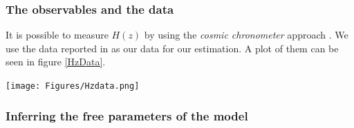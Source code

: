 \documentclass[onecolumn,           %
               showpacs,            %
               preprintnumbers,     %
               aps,                 %
               letterpaper,             %
               superscriptaddress,      %
               nofootinbib,         %
               tightenlines,        %
               floats,floatfix      %
               ,usenatbib,
               ]{revtex4-1}
\begin{document}
%

\subsubsection{The observables and the data}

It is possible to measure $H(z)$ by using the \textit{cosmic chronometer} approach \cite{Hz}. We use the data reported in \cite{Hzdata} as our data for our estimation. A plot of them can be seen in figure \ref{HzData}.

\begin{minipage}{\textwidth}
\centering
\texttt{[image: Figures/Hzdata.png]}
\label{HzData}
\end{minipage}

\subsubsection{Inferring the free parameters of the model}
\end{document}
